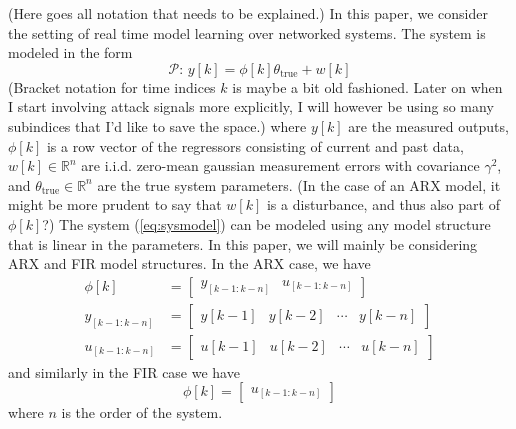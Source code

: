 
{\color{red}(Here goes all notation that needs to be explained.)}
In this paper, we consider the setting of real time model learning over
networked  systems. The system is modeled in the form
\begin{equation}
        \mathcal{P}:\, y[k] = \phi[k]\theta_{\text{true}} + w[k]
        \label{eq:sysmodel}
\end{equation}
{\color{red}(Bracket notation for time indices $k$ is maybe a bit old fashioned.
Later on when I start involving attack signals more explicitly, I will however be using so many
subindices that I'd like to save the space.)}
where $y[k]$ are the measured outputs, $\phi[k]$ is a row vector of
the regressors consisting of current and past data, $w[k] \in \mathbb{R}^n$
are i.i.d. zero-mean gaussian measurement errors with covariance $\gamma^2$, and
$\theta_{\text{true}} \in \mathbb{R}^n$ are the true system parameters.
{\color{red}(In the case of an ARX model, it might be more prudent to say that
$w[k]$ is a disturbance, and thus also part of $\phi[k]$?)}
The system (\ref{eq:sysmodel}) can be modeled using any model structure that
is linear in the parameters. In this paper, we will mainly be considering
ARX and FIR model structures. In the ARX case, we have
\begin{equation}
        \begin{split}
                \phi[k] &= \begin{bmatrix}
                        y_{[k-1:k-n]} & u_{[k-1:k-n]}  
                \end{bmatrix} \\
                y_{[k-1:k-n]} &= \begin{bmatrix}
                        y[k-1] & y[k-2] & \cdots & y[k-n]
                \end{bmatrix} \\
                u_{[k-1:k-n]}  &= \begin{bmatrix}
                        u[k-1] & u[k-2] & \cdots & u[k-n]
                \end{bmatrix}
        \end{split}
\end{equation}
and similarly in the FIR case we have
\begin{equation}
        \phi[k] = \begin{bmatrix}
                u_{[k-1:k-n]}  
        \end{bmatrix}
\end{equation}
where $n$ is the order of the system. \cite{ljung_system_1999}

